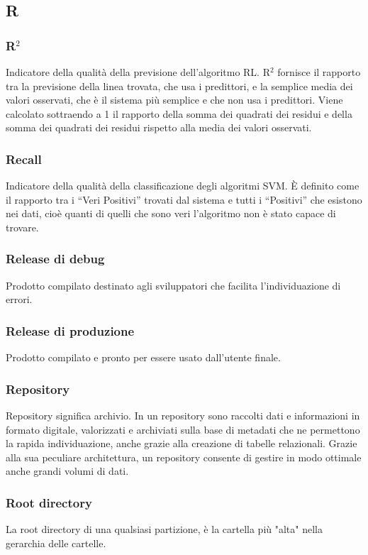 \subsection*{R}
\subsubsection*{R$^{2}$}
Indicatore della qualità della previsione dell'algoritmo RL. R$^{2}$ fornisce il rapporto tra la previsione della linea trovata, che usa i predittori, e la semplice media dei valori osservati, che è il sistema più semplice e che non usa i predittori. Viene calcolato sottraendo a 1 il rapporto della somma dei quadrati dei residui e della somma dei quadrati dei residui rispetto alla media dei valori osservati.

\subsubsection*{Recall}
Indicatore della qualità della classificazione degli algoritmi SVM. È definito come il rapporto tra i “Veri Positivi” trovati dal sistema e tutti i “Positivi” che esistono nei dati, cioè quanti di quelli che sono veri l'algoritmo non è stato capace di trovare.

\subsubsection*{Release di debug}
Prodotto compilato destinato agli sviluppatori che facilita l'individuazione di errori.

\subsubsection*{Release di produzione}
Prodotto compilato e pronto per essere usato dall'utente finale.


\subsubsection*{Repository}
Repository significa archivio. In un repository sono raccolti dati e informazioni in formato digitale, valorizzati e archiviati sulla base di metadati che ne permettono la rapida individuazione, anche grazie alla creazione di tabelle relazionali. Grazie alla sua peculiare architettura, un repository consente di gestire in modo ottimale anche grandi volumi di dati.
\subsubsection*{Root directory}
La root directory di una qualsiasi partizione, è la cartella più "alta" nella gerarchia delle cartelle.
